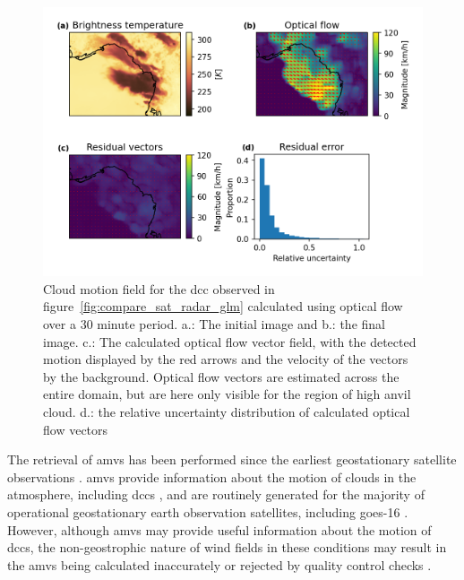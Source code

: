 \begin{figure}[t]
    \includegraphics[width=\textwidth]{figures/chapter1_14.png}
    \caption[
    Motion vectors, residual vectors and proportional vector uncertainty for optical flow motion vectors generated using the Farneback method
    ]{
    Cloud motion field for the \acrshort{dcc} observed in figure~\ref{fig:compare_sat_radar_glm} calculated using optical flow over a 30 minute period. a.: The initial image and b.: the final image. c.: The calculated optical flow vector field, with the detected motion displayed by the red arrows and the velocity of the vectors by the background. Optical flow vectors are estimated across the entire domain, but are here only visible for the region of high anvil cloud. d.: the relative uncertainty distribution of calculated optical flow vectors
    }
    \label{fig:optical_flow}
\end{figure}


The retrieval of \acrshort{amv}s has been performed since the earliest geostationary satellite observations \citep{menzel_cloud_2001}.
\acrshort{amv}s provide information about the motion of clouds in the atmosphere, including \acrshort{dcc}s \citep{bedka_application_2005}, and are routinely generated for the majority of operational geostationary earth observation satellites, including \acrshort{goes}-16 \citep{daniels_algorithm_nodate}. 
However, although \acrshort{amv}s may provide useful information about the motion of \acrshort{dcc}s, the non-geostrophic nature of wind fields in these conditions may result in the \acrshort{amv}s being calculated inaccurately or rejected by quality control checks \citep{bedka_application_2005}.


